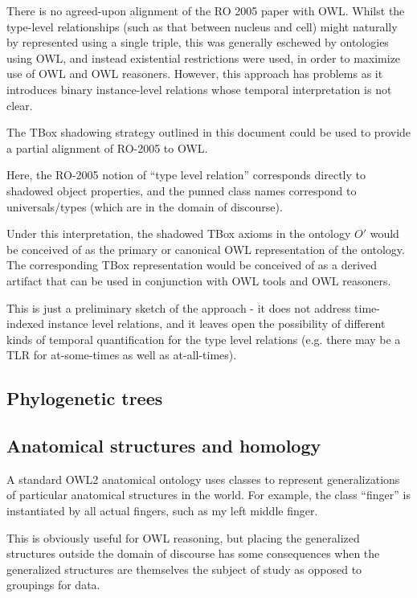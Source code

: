 \documentclass{my}
\begin{document}
There is no agreed-upon alignment of the RO 2005 paper with
OWL. Whilst the type-level relationships (such as that between nucleus
and cell) might naturally by represented using a single triple, this
was generally eschewed by ontologies using OWL, and instead
existential restrictions were used\cite{golbreich2007obo}, in order to
maximize use of OWL and OWL reasoners. However, this approach has
problems as it introduces binary instance-level relations whose
temporal interpretation is not clear.

The TBox shadowing strategy outlined in this document could be used to
provide a partial alignment of RO-2005 to OWL.

Here, the RO-2005 notion of ``type level relation'' corresponds
directly to shadowed object properties, and the punned class names
correspond to universals/types (which are in the domain of
discourse).

Under this interpretation, the shadowed TBox axioms in the ontology
$O'$ would be conceived of as the primary or canonical OWL
representation of the ontology. The corresponding TBox representation
would be conceived of as a derived artifact that can be used in
conjunction with OWL tools and OWL reasoners.

This is just a preliminary sketch of the approach - it does not
address time-indexed instance level relations, and it leaves open the
possibility of different kinds of temporal quantification for the type
level relations (e.g. there may be a TLR for at-some-times as well as
at-all-times).

\subsection{Phylogenetic trees}

\subsection{Anatomical structures and homology}

A standard OWL2 anatomical ontology uses classes to represent
generalizations of particular anatomical structures in the world. For
example, the class ``finger'' is instantiated by all actual fingers,
such as my left middle finger.

This is obviously useful for OWL reasoning, but placing the
generalized structures outside the domain of discourse has some
consequences when the generalized structures are themselves the
subject of study as opposed to groupings for data.
\end{document}
